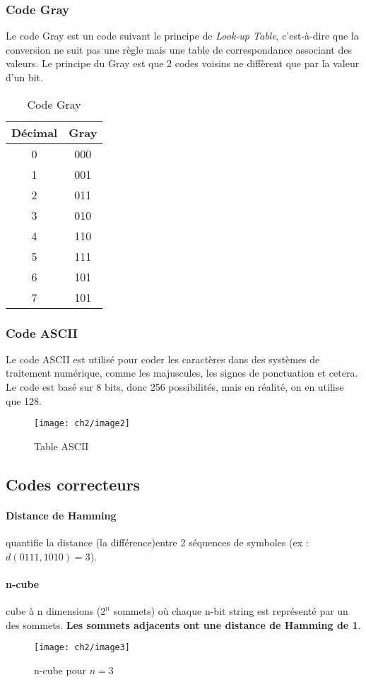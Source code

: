 \subsubsection{Code Gray}
Le code Gray est un code suivant le principe de \textit{Look-up Table}, c'est-à-dire que la conversion ne suit pas une règle mais une table de correspondance associant des valeurs. Le principe du Gray est que 2 codes voisins ne diffèrent que par la valeur d'un bit.
\begin{table}[H]
	\centering
	\begin{tabular}{c|c}
		Décimal & Gray \\
		\hline
		0 & 000\\
		 \hline
		1 & 001\\
		 \hline
		2 & 011\\
		 \hline
		3 & 010\\
		 \hline
		4 & 110\\
		 \hline
		5 & 111\\
		 \hline
		6 & 101\\
		 \hline
		7 & 101		 
	\end{tabular}
	\caption{Code Gray}
\end{table}
\subsubsection{Code ASCII}
Le code ASCII est utilisé pour coder les caractères dans des systèmes de traitement numérique, comme les majuscules, les signes de ponctuation et cetera. Le code est basé sur 8 bits, donc 256 possibilités, mais en réalité, on en utilise que 128.
\begin{figure}[H]
	\centering
	\texttt{[image: ch2/image2]}
	\caption{Table ASCII}
\end{figure}
\subsection{Codes correcteurs}
\paragraph{Distance de Hamming} quantifie la distance (la différence)entre 2 séquences de symboles (ex : $d(0111,1010)=3$).
\paragraph{n-cube} cube à n dimensions ($2^n$ sommets) où chaque n-bit string est représenté par un des sommets. \textbf{Les sommets adjacents ont une distance de Hamming de 1}.
\begin{figure}[H]
	\centering
	\texttt{[image: ch2/image3]}
	\caption{n-cube pour $n=3$}
\end{figure}
